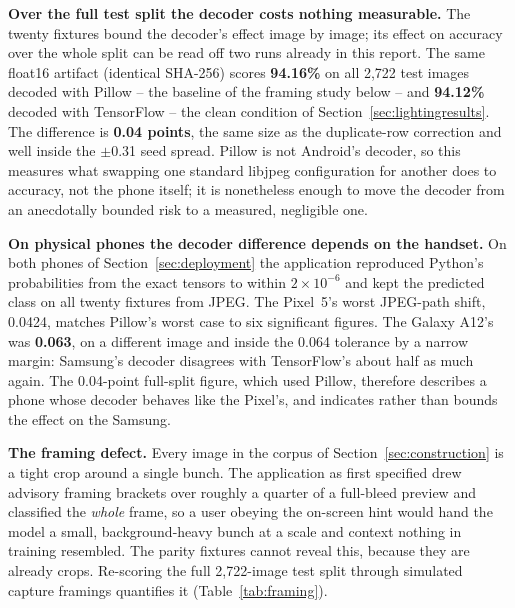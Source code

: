 \documentclass{article}
\begin{document}
\textbf{Over the full test split the decoder costs nothing measurable.} The twenty fixtures bound
the decoder's effect image by image; its effect on accuracy over the whole split can be read off two
runs already in this report. The same float16 artifact (identical SHA-256) scores \textbf{94.16\%} on
all 2,722 test images decoded with Pillow -- the baseline of the framing study below -- and
\textbf{94.12\%} decoded with TensorFlow -- the clean condition of Section~\ref{sec:lightingresults}.
The difference is \textbf{0.04 points}, the same size as the duplicate-row correction and well inside
the $\pm$0.31 seed spread. Pillow is not Android's decoder, so this measures what swapping one standard
libjpeg configuration for another does to accuracy, not the phone itself; it is nonetheless enough to
move the decoder from an anecdotally bounded risk to a measured, negligible one.

\textbf{On physical phones the decoder difference depends on the handset.} On both phones of
Section~\ref{sec:deployment} the application reproduced Python's probabilities from the exact tensors to
within $2\times10^{-6}$ and kept the predicted class on all twenty fixtures from JPEG. The Pixel~5's
worst JPEG-path shift, 0.0424, matches Pillow's worst case to six significant figures. The Galaxy A12's
was \textbf{0.063}, on a different image and inside the 0.064 tolerance by a narrow margin: Samsung's
decoder disagrees with TensorFlow's about half as much again. The 0.04-point full-split figure, which
used Pillow, therefore describes a phone whose decoder behaves like the Pixel's, and indicates rather
than bounds the effect on the Samsung.

\textbf{The framing defect.} Every image in the corpus of Section~\ref{sec:construction} is a tight crop
around a single bunch. The application as first specified drew advisory framing brackets over roughly a
quarter of a full-bleed preview and classified the \textit{whole} frame, so a user obeying the on-screen
hint would hand the model a small, background-heavy bunch at a scale and context nothing in training
resembled. The parity fixtures cannot reveal this, because they are already crops. Re-scoring the full
2{,}722-image test split through simulated capture framings quantifies it (Table~\ref{tab:framing}).
\end{document}
